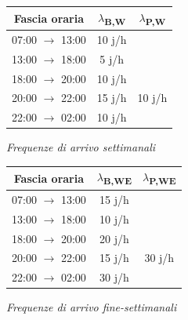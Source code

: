 \documentclass[a4paper, 12pt]{article}
\newcommand{\xmark}[0]{\ding{55}}
\begin{document}
\begin{table}[!htb]
  \begin{minipage}{.5\linewidth}
    \centering
    
        \begin{tabular}{ |c|c|c| }
          \hline
          \cellcolor{cellcolor}Fascia oraria & \cellcolor{cellcolor}$\lambda${\textsubscript{B,W}} & \cellcolor{cellcolor}$\lambda${\textsubscript{P,W}} \\
          \hline
          \hline
          07:00 $\rightarrow$ 13:00 & 10 j/h & \xmark \\
          \hline
          13:00 $\rightarrow$ 18:00 & 5 j/h & \xmark \\
          \hline
          18:00 $\rightarrow$ 20:00 & 10 j/h & \xmark \\
          \hline
          20:00 $\rightarrow$ 22:00 & 15 j/h & 10 j/h \\
          \hline
          22:00 $\rightarrow$ 02:00 & 10 j/h & \xmark \\
          \hline
        \end{tabular}
        \bigskip
        
		\textit{Frequenze di arrivo settimanali} 
  \end{minipage}
  \begin{minipage}{.5\linewidth}
    \centering
        \begin{tabular}{ |c|c|c| }
          \hline
          \cellcolor{cellcolor}Fascia oraria & \cellcolor{cellcolor} $\lambda${\textsubscript{B,WE}}
      & \cellcolor{cellcolor}$\lambda${\textsubscript{P,WE}} \\
          \hline
          \hline
          07:00 $\rightarrow$ 13:00 & 15 j/h & \xmark \\
          \hline
          13:00 $\rightarrow$ 18:00 &10 j/h & \xmark \\
          \hline
          18:00 $\rightarrow$ 20:00 & 20 j/h & \xmark \\
          \hline
          20:00 $\rightarrow$ 22:00 & 15 j/h & 30 j/h \\
          \hline
          22:00 $\rightarrow$ 02:00 & 30 j/h & \xmark \\
          \hline
        \end{tabular}
        \bigskip
        
        \textit{Frequenze di arrivo fine-settimanali} 
  \end{minipage} 
\end{table}
\end{document}
